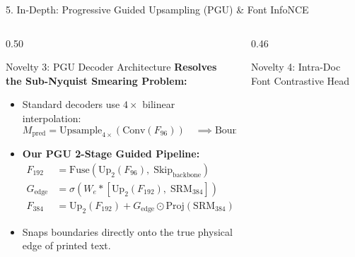 \documentclass[aspectratio=169, 10pt]{beamer}
\begin{document}
\begin{frame}{5. In-Depth: Progressive Guided Upsampling (PGU) \& Font InfoNCE}
  \begin{columns}[T]
    \begin{column}{0.50\textwidth}
      \begin{crispbox}{Novelty 3: PGU Decoder Architecture}
        \textbf{Resolves the Sub-Nyquist Smearing Problem:}
        \begin{itemize}\scriptsize
          \item Standard decoders use $4\times$ bilinear interpolation:
            $$M_{\text{pred}} = \text{Upsample}_{4\times}(\text{Conv}(F_{96})) \quad \implies \text{Boundary Blur!}$$
          \item \textbf{Our PGU 2-Stage Guided Pipeline:}
            \begin{align*}
              F_{192} &= \text{Fuse}(\text{Up}_2(F_{96}), \; \text{Skip}_{\text{backbone}}) \\
              G_{\text{edge}} &= \sigma(W_e * [\text{Up}_2(F_{192}), \; \text{SRM}_{384}]) \\
              F_{384} &= \text{Up}_2(F_{192}) + G_{\text{edge}} \odot \text{Proj}(\text{SRM}_{384})
            \end{align*}
          \item Snaps boundaries directly onto the true physical edge of printed text.
        \end{itemize}
      \end{crispbox}
    \end{column}

    \begin{column}{0.46\textwidth}
      \begin{crispbox}{Novelty 4: Intra-Doc Font Contrastive Head}
        \begin{center}
\end{center}
\end{crispbox}
\end{column}
\end{columns}
\end{frame}
\end{document}
